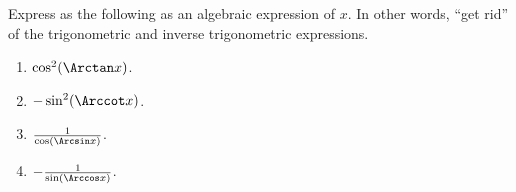Express as the following as an algebraic expression of $x$. In other words, ``get rid'' of the trigonometric and inverse trigonometric expressions.

\begin{enumerate}[ref={\fcProblemRef}]
\item $\cos^2(\Arctan x)$. 

\item \label{problem-sin^2(arccot x) } $-\sin^2(\Arccot x)$. 

\item $\frac{1}{\cos(\Arcsin x)}$. 

\item $-\frac{1}{\sin(\Arccos x)}$.

\end{enumerate}
